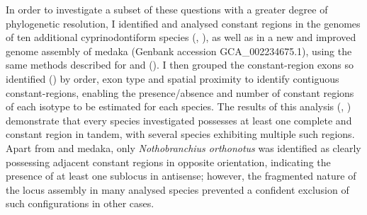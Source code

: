 In order to investigate a subset of these questions with a greater degree of phylogenetic resolution, I identified and analysed \igh{} constant regions in the genomes of ten additional cyprinodontiform species (, ), as well as in a new and improved genome assembly of medaka (Genbank accession GCA\_002234675.1), using the same methods described for \Nfu and \Xma (). I then grouped the constant-region exons so identified () by order, exon type and spatial proximity to identify contiguous constant-regions, enabling the presence/absence and number of constant regions of each isotype to be estimated for each species. The results of this analysis (, ) demonstrate that every species investigated possesses at least one complete  and  constant region in tandem, with several species exhibiting multiple such regions. Apart from \Nfu and medaka, only \textit{Nothobranchius orthonotus} was identified as clearly possessing adjacent constant regions in opposite orientation, indicating the presence of at least one sublocus in antisense; however, the fragmented nature of the \igh{} locus assembly in many analysed species prevented a confident exclusion of such configurations in other cases.

